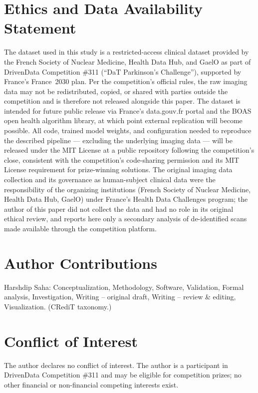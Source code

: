 \documentclass[11pt]{article}
\begin{document}
\section{Ethics and Data Availability Statement}
\label{sec:ethics}

The dataset used in this study is a restricted-access clinical dataset provided by the French Society of Nuclear Medicine, Health Data Hub, and GaelO as part of DrivenData Competition \#311 (``DaT Parkinson's Challenge''), supported by France's France~2030 plan. Per the competition's official rules, the raw imaging data may not be redistributed, copied, or shared with parties outside the competition and is therefore not released alongside this paper. The dataset is intended for future public release via France's data.gouv.fr portal and the BOAS open health algorithm library, at which point external replication will become possible. All code, trained model weights, and configuration needed to reproduce the described pipeline --- excluding the underlying imaging data --- will be released under the MIT License at a public repository following the competition's close, consistent with the competition's code-sharing permission and its MIT License requirement for prize-winning solutions. The original imaging data collection and its governance as human-subject clinical data were the responsibility of the organizing institutions (French Society of Nuclear Medicine, Health Data Hub, GaelO) under France's Health Data Challenges program; the author of this paper did not collect the data and had no role in its original ethical review, and reports here only a secondary analysis of de-identified scans made available through the competition platform.

\section{Author Contributions}
Harshdip Saha: Conceptualization, Methodology, Software, Validation, Formal analysis, Investigation, Writing -- original draft, Writing -- review \& editing, Visualization. (CRediT taxonomy.)

\section{Conflict of Interest}
The author declares no conflict of interest. The author is a participant in DrivenData Competition \#311 and may be eligible for competition prizes; no other financial or non-financial competing interests exist.
\end{document}
